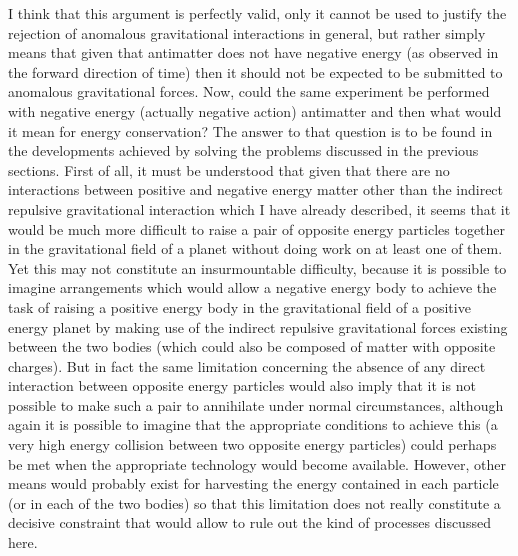 \documentclass[notitlepage,12pt]{report}
\begin{document}
I think that this argument is perfectly valid, only it cannot be used to justify the rejection of anomalous gravitational interactions in general, but rather simply means that given that antimatter does not have negative energy (as observed in the forward direction of time) then it should not be expected to be submitted to anomalous gravitational forces. Now, could the same experiment be performed with negative energy (actually negative action) antimatter and then what would it mean for energy conservation? The answer to that question is to be found in the developments achieved by solving the problems discussed in the previous sections. First of all, it must be understood that given that there are no interactions between positive and negative energy matter other than the indirect repulsive gravitational interaction which I have already described, it seems that it would be much more difficult to raise a pair of opposite energy particles together in the gravitational field of a planet without doing work on at least one of them. Yet this may not constitute an insurmountable difficulty, because it is possible to imagine arrangements which would allow a negative energy body to achieve the task of raising a positive energy body in the gravitational field of a positive energy planet by making use of the indirect repulsive gravitational forces existing between the two bodies (which could also be composed of matter with opposite charges). But in fact the same limitation concerning the absence of any direct interaction between opposite energy particles would also imply that it is not possible to make such a pair to annihilate under normal circumstances, although again it is possible to imagine that the appropriate conditions to achieve this (a very high energy collision between two opposite energy particles) could perhaps be met when the appropriate technology would become available. However, other means would probably exist for harvesting the energy contained in each particle (or in each of the two bodies) so that this limitation does not really constitute a decisive constraint that would allow to rule out the kind of processes discussed here.
\end{document}
